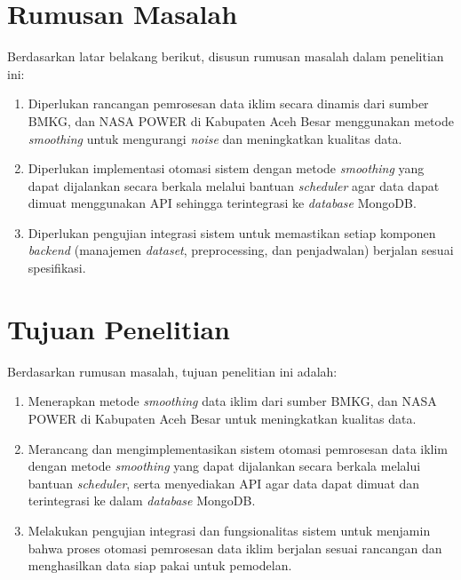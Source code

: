 \section{Rumusan Masalah}
Berdasarkan latar belakang berikut, disusun rumusan masalah dalam penelitian ini:
\begin{enumerate}
    \item Diperlukan rancangan pemrosesan data iklim secara dinamis dari sumber BMKG, dan NASA POWER di Kabupaten Aceh Besar menggunakan metode \textit{smoothing} untuk mengurangi \textit{noise} dan meningkatkan kualitas data.

    \item Diperlukan implementasi otomasi sistem dengan metode \textit{smoothing} yang dapat dijalankan secara berkala melalui bantuan \textit{scheduler} agar data dapat dimuat menggunakan API sehingga terintegrasi ke \textit{database} MongoDB.

    \item Diperlukan pengujian integrasi sistem untuk memastikan setiap komponen \textit{backend} (manajemen \textit{dataset}, preprocessing, dan penjadwalan) berjalan sesuai spesifikasi.

\end{enumerate}


\section{Tujuan Penelitian}
    Berdasarkan rumusan masalah, tujuan penelitian ini adalah:
\begin{enumerate}
    \item Menerapkan metode \textit{smoothing} data iklim dari sumber BMKG, dan NASA POWER di Kabupaten Aceh Besar untuk meningkatkan kualitas data.

    \item Merancang dan mengimplementasikan sistem otomasi pemrosesan data iklim dengan metode \textit{smoothing} yang dapat dijalankan secara berkala melalui bantuan \textit{scheduler}, serta menyediakan API agar data dapat dimuat dan terintegrasi ke dalam \textit{database} MongoDB.
    
    \item Melakukan pengujian integrasi dan fungsionalitas sistem untuk menjamin bahwa proses otomasi pemrosesan data iklim berjalan sesuai rancangan dan menghasilkan data siap pakai untuk pemodelan.
\end{enumerate}

